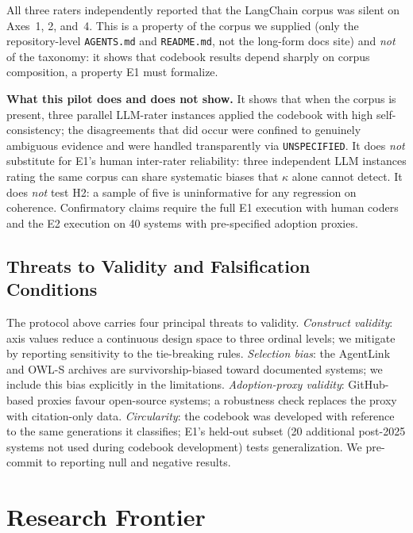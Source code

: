 \documentclass[10pt,twocolumn]{article}
\begin{document}
All three raters independently reported that the LangChain corpus was silent on Axes~1, 2, and~4.  This is a property of the corpus we supplied (only the repository-level \texttt{AGENTS.md} and \texttt{README.md}, not the long-form docs site) and \emph{not} of the taxonomy: it shows that codebook results depend sharply on corpus composition, a property E1 must formalize.

\textbf{What this pilot does and does not show.}  It shows that when the corpus is present, three parallel LLM-rater instances applied the codebook with high self-consistency; the disagreements that did occur were confined to genuinely ambiguous evidence and were handled transparently via \texttt{UNSPECIFIED}.  It does \emph{not} substitute for E1's human inter-rater reliability: three independent LLM instances rating the same corpus can share systematic biases that $\kappa$ alone cannot detect.  It does \emph{not} test H2: a sample of five is uninformative for any regression on coherence.  Confirmatory claims require the full E1 execution with human coders and the E2 execution on 40 systems with pre-specified adoption proxies.

\subsection{Threats to Validity and Falsification Conditions}

The protocol above carries four principal threats to validity.  \emph{Construct validity}: axis values reduce a continuous design space to three ordinal levels; we mitigate by reporting sensitivity to the tie-breaking rules.  \emph{Selection bias}: the AgentLink and OWL-S archives are survivorship-biased toward documented systems; we include this bias explicitly in the limitations.  \emph{Adoption-proxy validity}: GitHub-based proxies favour open-source systems; a robustness check replaces the proxy with citation-only data.  \emph{Circularity}: the codebook was developed with reference to the same generations it classifies; E1's held-out subset (20 additional post-2025 systems not used during codebook development) tests generalization.  We pre-commit to reporting null and negative results.


\section{Research Frontier}\label{sec:frontier}
\end{document}
